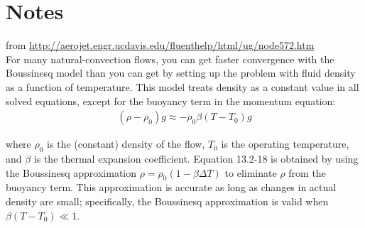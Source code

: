 \chapter{Notes}

from \url{http://aerojet.engr.ucdavis.edu/fluenthelp/html/ug/node572.htm} \\

For many natural-convection flows, you can get faster convergence with the Boussinesq model than 
you can get by setting up the problem with fluid density as a function of temperature. This model 
treats density as a constant value in all solved equations, except for the buoyancy term in the momentum 
equation:
\begin{align}
 (\rho - \rho_0) g \approx -\rho_0 \beta (T - T_0) g 	
\end{align}

where  $\rho_0$ is the (constant) density of the flow,  $T_0$ is the operating temperature, and  $\beta$ is 
the thermal expansion coefficient. Equation  13.2-18 is obtained by using the Boussinesq approximation  
$\rho = \rho_0 (1 - \beta \Delta T)$ to eliminate  $\rho$ from the buoyancy term. This approximation is accurate as 
long as changes in actual density are small; specifically, the Boussinesq approximation is valid when  $\beta(T-T_0)\ll 1$.
